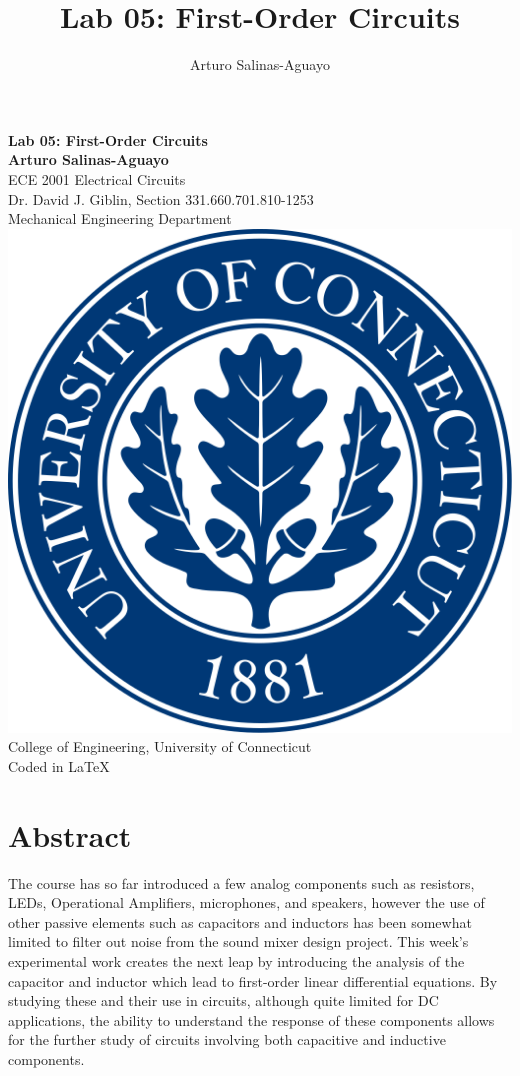 \documentclass[12pt]{article}
\author{Arturo Salinas-Aguayo}
\title{Lab 05: First-Order Circuits}
\begin{document}
\newcommand{\closure}[2][3]{%
	{}\mkern#1mu\overline{\mkern-#1mu#2}}
\newcommand\ncoverline[1]{\mkern1mu\overline{\mkern-1mu#1\mkern-1mu}\mkern1mu}
\begin{titlepage}
	\centering
	\vspace*{3cm}
	\huge\textbf{Lab 05: First-Order Circuits}\\
	
	\vspace{5cm}
	\Large\textbf{Arturo Salinas-Aguayo}\\
	\normalsize
	ECE 2001 Electrical Circuits\\
	Dr. David J. Giblin, Section 331.660.701.810-1253\\
	Mechanical Engineering Department
	\vfill
	\includegraphics[scale=0.1]{uconnlogo}\\
	College of Engineering, University of Connecticut\\
	\scriptsize{Coded in \LaTeX}
	\vspace*{1cm}
\end{titlepage}
\tableofcontents
\newpage
\section{Abstract}
The course has so far introduced a few analog components such as resistors,
LEDs, Operational Amplifiers, microphones, and speakers, however the use of
other passive elements such as capacitors and inductors has been somewhat
limited to filter out noise from the sound mixer design project. This week's
experimental work creates the next leap by introducing the analysis of the
capacitor and inductor which lead to first-order linear differential equations.
By studying these and their use in circuits, although quite limited for DC
applications, the ability to understand the response of these components allows
for the further study of circuits involving both capacitive and inductive
components. 
\newpage
\end{document}
